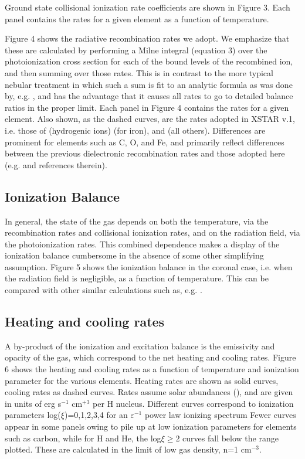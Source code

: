 Ground state collisional ionization rate coefficients are shown in 
Figure 3.  Each panel contains the rates for a given element as a function of 
temperature.

Figure 4 shows the radiative recombination rates we adopt.
We emphasize that these are calculated by performing 
a Milne integral (equation 3) over the photoionization cross section
for each of the bound levels of the recombined ion, and then summing over
those rates.  This is in contrast to the more typical nebular 
treatment in which such a sum is fit to an analytic formula as was 
done by, e.g. \cite{Aldrovandi1973}, and has the advantage that it 
causes all rates to go to detailed balance ratios in the proper limit.
Each panel in Figure 4 contains the rates for a given 
element.  Also shown, as the dashed curves, are the rates 
adopted in XSTAR v.1, i.e. those of \cite{Gould1970} (hydrogenic ions)
\cite{Arnaud1992} (for iron), and \cite{Aldrovandi1973} (all others).
Differences are prominent for elements such as C, O, and Fe, and 
primarily reflect differences between the previous dielectronic recombination 
rates and those adopted here (e.g. \cite{Nahar2000} and references therein).

\subsection{Ionization Balance}

In general, the state of the gas depends on both the temperature, via the 
recombination rates and collisional ionization rates, and on the radiation 
field, via the photoionization rates.  This combined dependence makes a
display of the ionization balance cumbersome in the absence of some other 
simplifying assumption.  Figure 5 shows the ionization balance in the coronal case,
i.e. when the radiation field is negligible, as a function of temperature.  This can 
be compared with other similar calculations such as, e.g. \cite{Arnaud1985}.

\subsection{Heating and cooling rates}

A by-product of the ionization and excitation balance is the emissivity and 
opacity of the gas, which correspond to the net heating and cooling rates.
Figure 6 shows the heating and cooling rates as a function 
of temperature and ionization parameter for the various elements.  
Heating rates are shown as solid curves, 
cooling rates as dashed curves.  Rates assume solar abundances
(\cite{Grevesse1996}), and are given in units of 
erg s$^{-1}$ cm$^{+3}$ per H nucleus.  Different curves 
correspond to ionization parameters log($\xi$)=0,1,2,3,4
for an $\varepsilon^{-1}$ power law ionizing spectrum
Fewer curves appear in some panels owing to pile up at low 
ionization parameters for elements such as carbon, while for 
H and He, the log$\xi \geq 2$ curves fall below the range plotted. 
These are calculated in the limit of low gas density, n=1 cm$^{-3}$.

